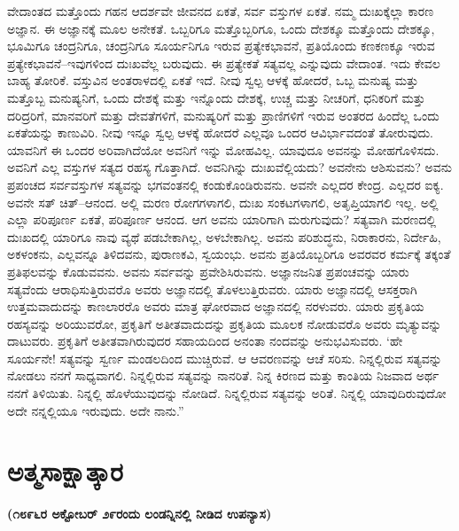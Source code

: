 ವೇದಾಂತದ ಮತ್ತೊಂದು ಗಹನ ಆದರ್ಶವೇ ಜೀವನದ ಏಕತೆ, ಸರ್ವ ವಸ್ತುಗಳ ಏಕತೆ. ನಮ್ಮ ದುಃಖಕ್ಕೆಲ್ಲಾ ಕಾರಣ ಅಜ್ಞಾನ. ಈ ಅಜ್ಞಾನಕ್ಕೆ ಮೂಲ ಅನೇಕತೆ. ಒಬ್ಬರಿಗೂ ಮತ್ತೊಬ್ಬರಿಗೂ, ಒಂದು ದೇಶಕ್ಕೂ ಮತ್ತೊಂದು ದೇಶಕ್ಕೂ, ಭೂಮಿಗೂ ಚಂದ್ರನಿಗೂ, ಚಂದ್ರನಿಗೂ ಸೂರ್ಯನಿಗೂ ಇರುವ ಪ್ರತ್ಯೇಕಭಾವನೆ, ಪ್ರತಿಯೊಂದು ಕಣಕಣಕ್ಕೂ ಇರುವ ಪ್ರತ್ಯೇಕಭಾವನೆ–ಇವುಗಳಿಂದ ದುಃಖವೆಲ್ಲ ಬರುವುದು. ಈ ಪ್ರತ್ಯೇಕತೆ ಸತ್ಯವಲ್ಲ ಎನ್ನುವುದು ವೇದಾಂತ. ಇದು ಕೇವಲ ಬಾಹ್ಯ ತೋರಿಕೆ. ವಸ್ತುವಿನ ಅಂತರಾಳದಲ್ಲಿ ಏಕತೆ ಇದೆ. ನೀವು ಸ್ವಲ್ಪ ಆಳಕ್ಕೆ ಹೋದರೆ, ಒಬ್ಬ ಮನುಷ್ಯ ಮತ್ತು ಮತ್ತೊಬ್ಬ ಮನುಷ್ಯನಿಗೆ, ಒಂದು ದೇಶಕ್ಕೆ ಮತ್ತು ಇನ್ನೊಂದು ದೇಶಕ್ಕೆ, ಉಚ್ಚ ಮತ್ತು ನೀಚರಿಗೆ, ಧನಿಕರಿಗೆ ಮತ್ತು ದರಿದ್ರರಿಗೆ, ಮಾನವರಿಗೆ ಮತ್ತು ದೇವತೆಗಳಿಗೆ, ಮನುಷ್ಯರಿಗೆ ಮತ್ತು ಪ್ರಾಣಿಗಳಿಗೆ ಇರುವ ಅಂತರದ ಹಿಂದೆಲ್ಲ ಒಂದು ಏಕತೆಯನ್ನು ಕಾಣುವಿರಿ. ನೀವು ಇನ್ನೂ ಸ್ವಲ್ಪ ಆಳಕ್ಕೆ ಹೋದರೆ ಎಲ್ಲವೂ ಒಂದರ ಆವಿರ್ಭಾವದಂತೆ ತೋರುವುದು. ಯಾವನಿಗೆ ಈ ಒಂದರ ಅರಿವಾಗಿದೆಯೋ ಅವನಿಗೆ ಇನ್ನು ಮೋಹವಿಲ್ಲ. ಯಾವುದೂ ಅವನನ್ನು ಮೋಹಗೊಳಿಸದು. ಅವನಿಗೆ ಎಲ್ಲ ವಸ್ತುಗಳ ಸತ್ಯದ ರಹಸ್ಯ ಗೊತ್ತಾಗಿದೆ. ಅವನಿಗಿನ್ನು ದುಃಖವೆಲ್ಲಿಯದು? ಅವನೇನು ಆಶಿಸುವನು? ಅವನು ಪ್ರಪಂಚದ ಸರ್ವವಸ್ತುಗಳ ಸತ್ಯವನ್ನು ಭಗವಂತನಲ್ಲಿ ಕಂಡುಕೊಂಡಿರುವನು. ಅವನೇ ಎಲ್ಲದರ ಕೇಂದ್ರ. ಎಲ್ಲದರ ಐಕ್ಯ. ಅವನೇ ಸತ್​ ಚಿತ್​–ಆನಂದ. ಅಲ್ಲಿ ಮರಣ ರೋಗಗಳಾಗಲಿ, ದುಃಖ ಸಂಕಟಗಳಾಗಲಿ, ಅತೃಪ್ತಿಯಾಗಲಿ ಇಲ್ಲ. ಅಲ್ಲಿ ಎಲ್ಲಾ ಪರಿಪೂರ್ಣ ಏಕತೆ, ಪರಿಪೂರ್ಣ ಆನಂದ. ಆಗ ಅವನು ಯಾರಿಗಾಗಿ ಮರುಗುವುದು? ಸತ್ಯವಾಗಿ ಮರಣದಲ್ಲಿ ದುಃಖದಲ್ಲಿ ಯಾರಿಗೂ ನಾವು ವ್ಯಥೆ ಪಡಬೇಕಾಗಿಲ್ಲ, ಅಳಬೇಕಾಗಿಲ್ಲ. ಅವನು ಪರಿಶುದ್ಧನು, ನಿರಾಕಾರನು, ನಿರ್ದೇಹಿ, ಅಕಳಂಕನು, ಎಲ್ಲವನ್ನೂ ತಿಳಿದವನು, ಪುರಾಣಕವಿ, ಸ್ವಯಂಭು. ಅವನು ಪ್ರತಿಯೊಬ್ಬರಿಗೂ ಅವರವರ ಕರ್ಮಕ್ಕೆ ತಕ್ಕಂತೆ ಪ್ರತಿಫಲವನ್ನು ಕೊಡುವವನು. ಅವನು ಸರ್ವವನ್ನು ಪ್ರವೇಶಿಸಿರುವನು. ಅಜ್ಞಾನಜನಿತ ಪ್ರಪಂಚವನ್ನು ಯಾರು ಸತ್ಯವೆಂದು ಆರಾಧಿಸುತ್ತಿರುವರೊ ಅವರು ಅಜ್ಞಾನದಲ್ಲಿ ತೊಳಲುತ್ತಿರುವರು. ಯಾರು ಅಜ್ಞಾನದಲ್ಲಿ ಆಸಕ್ತರಾಗಿ ಉತ್ತಮವಾದುದನ್ನು ಕಾಣಲಾರರೊ ಅವರು ಮಾತ್ರ ಘೋರವಾದ ಅಜ್ಞಾನದಲ್ಲಿ ನರಳುವರು. ಯಾರು ಪ್ರಕೃತಿಯ ರಹಸ್ಯವನ್ನು ಅರಿಯುವರೋ, ಪ್ರಕೃತಿಗೆ ಅತೀತವಾದುದನ್ನು ಪ್ರಕೃತಿಯ ಮೂಲಕ ನೋಡುವರೊ ಅವರು ಮೃತ್ಯುವನ್ನು ದಾಟುವರು. ಪ್ರಕೃತಿಗೆ ಅತೀತವಾಗಿರುವುದರ ಸಹಾಯದಿಂದ ಅನಂತಾ ನಂದವನ್ನು ಅನುಭವಿಸುವರು. ‘ಹೇ ಸೂರ್ಯನೇ! ಸತ್ಯವನ್ನು ಸ್ವರ್ಣ ಮಂಡಲದಿಂದ ಮುಚ್ಚಿರುವೆ. ಆ ಆವರಣವನ್ನು ಆಚೆ ಸರಿಸು. ನಿನ್ನಲ್ಲಿರುವ ಸತ್ಯವನ್ನು ನೋಡಲು ನನಗೆ ಸಾಧ್ಯವಾಗಲಿ. ನಿನ್ನಲ್ಲಿರುವ ಸತ್ಯವನ್ನು ನಾನರಿತೆ. ನಿನ್ನ ಕಿರಣದ ಮತ್ತು ಕಾಂತಿಯ ನಿಜವಾದ ಅರ್ಥ ನನಗೆ ತಿಳಿಯಿತು. ನಿನ್ನಲ್ಲಿ ಹೊಳೆಯುವುದನ್ನು ನೋಡಿದೆ. ನಿನ್ನಲ್ಲಿರುವ ಸತ್ಯವನ್ನು ಅರಿತೆ. ನಿನ್ನಲ್ಲಿ ಯಾವುದಿರುವುದೋ ಅದೇ ನನ್ನಲ್ಲಿಯೂ ಇರುವುದು. ಅದೇ ನಾನು.”

\chapter{ಅತ್ಮಸಾಕ್ಷಾತ್ಕಾರ}

\centerline{\textbf{(೧೮೯೬ರ ಅಕ್ಟೋಬರ್​ ೨೯ರಂದು ಲಂಡನ್ನಿನಲ್ಲಿ ನೀಡಿದ ಉಪನ್ಯಾಸ)}}

